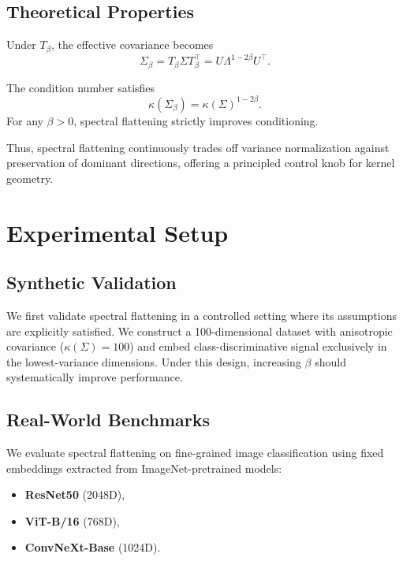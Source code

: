 \documentclass{article}
\begin{document}
\subsection{Theoretical Properties}

\begin{proposition}
Under $T_\beta$, the effective covariance becomes
\[
\Sigma_\beta = T_\beta \Sigma T_\beta^\top = U \Lambda^{1-2\beta} U^\top.
\]
\end{proposition}

\begin{proposition}
The condition number satisfies
\[
\kappa(\Sigma_\beta) = \kappa(\Sigma)^{1-2\beta}.
\]
For any $\beta>0$, spectral flattening strictly improves conditioning.
\end{proposition}

Thus, spectral flattening continuously trades off variance normalization against preservation of dominant directions, offering a principled control knob for kernel geometry.

\section{Experimental Setup}

\subsection{Synthetic Validation}

We first validate spectral flattening in a controlled setting where its assumptions are explicitly satisfied. We construct a 100-dimensional dataset with anisotropic covariance ($\kappa(\Sigma)=100$) and embed class-discriminative signal exclusively in the lowest-variance dimensions. Under this design, increasing $\beta$ should systematically improve performance.

\subsection{Real-World Benchmarks}

We evaluate spectral flattening on fine-grained image classification using fixed embeddings extracted from ImageNet-pretrained models:
\begin{itemize}
    \item \textbf{ResNet50} (2048D),
    \item \textbf{ViT-B/16} (768D),
    \item \textbf{ConvNeXt-Base} (1024D).
\end{itemize}
\end{document}
